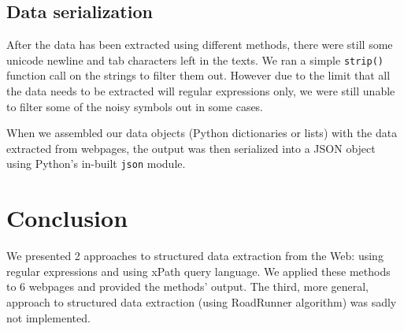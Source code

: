 \documentclass[9pt]{IEEEtran}
\begin{document}
\subsection{Data serialization}
After the data has been extracted using different methods, there were still some unicode newline and tab characters left in the texts. We ran a simple \texttt{strip()} function call on the strings to filter them out.
However due to the limit that all the data needs to be extracted will regular expressions only, we were still unable to filter some of the noisy symbols out in some cases.

When we assembled our data objects (Python dictionaries or lists) with the data extracted from webpages, the output was then serialized into a JSON object using Python's in-built \verb/json/ module.

\section{Conclusion}
\label{section:conclusion}
We presented 2 approaches to structured data extraction from the Web: using regular expressions and using xPath query language.
We applied these methods to 6 webpages and provided the methods' output.
The third, more general, approach to structured data extraction (using RoadRunner algorithm) was sadly not implemented.



\end{document}
